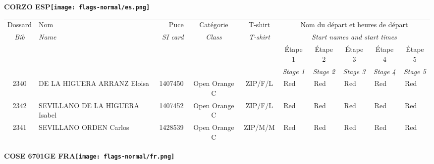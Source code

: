 \documentclass{report}
\begin{document}
\newpage
  \Huge \centering \bfseries CORZO  ESP\normalfont \footnotesize \sffamily \hfill \texttt{[image: flags-normal/es.png]} \newline 
  \begin{longtable}{|c|l|r|c|c|*{5}{cc|}}
    Dossard & Nom  & Puce    & Catégorie & T-shirt & \multicolumn{10}{c|}{Nom du départ et heures de départ} \\
    \itshape Bib     & \itshape Name & \itshape SI card & \itshape Class  & \itshape  T-shirt  & \multicolumn{10}{c|}{\itshape Start names and start times} \\
    \hline
    & & & & & \multicolumn{2}{c|}{Étape 1} & \multicolumn{2}{c|}{Étape 2} & \multicolumn{2}{c|}{Étape 3} & \multicolumn{2}{c|}{Étape 4} & \multicolumn{2}{c|}{Étape 5} \\
    & & & & & \multicolumn{2}{c|}{\itshape Stage 1} & \multicolumn{2}{c|}{\itshape Stage 2} & \multicolumn{2}{c|}{\itshape Stage 3} & \multicolumn{2}{c|}{\itshape Stage 4} & \multicolumn{2}{c|}{\itshape Stage 5} \\
    \hline
    2340 & DE LA HIGUERA ARRANZ Eloisa & 1407450 & Open Orange C & ZIP/F/L & Red &   & Red &   & Red &   & Red &   & Red &  \\
    2342 & SEVILLANO DE LA HIGUERA Isabel & 1407452 & Open Orange C & ZIP/F/L & Red &   & Red &   & Red &   & Red &   & Red &  \\
    2341 & SEVILLANO ORDEN Carlos & 1428539 & Open Orange C & ZIP/M/M & Red &   & Red &   & Red &   & Red &   & Red &  \\
  \end{longtable}
\newpage
  \Huge \centering \bfseries COSE 6701GE FRA\normalfont \footnotesize \sffamily \hfill \texttt{[image: flags-normal/fr.png]} \newline 
\end{document}
